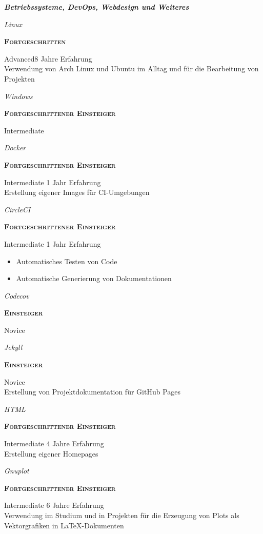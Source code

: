 \documentclass[8pt]{article}
\newcommand{\cvSubsectionStyle}{%
  \normalfont%
  \sffamily%
  \itshape%
  \bfseries%
  \color{cvSubsectionColor}%
}
\newcommand{\cvSubsection}[1]{%
  \begin{tcolorbox}[left=0pt, top=0pt, bottom=0pt, right=0pt, boxsep=5pt, arc=5pt, frame code={}, colback=cvBackgroundColor]
    \cvSubsectionStyle #1%
  \end{tcolorbox}
}
\newenvironment{cvItemize}{%
  \begin{itemize}[itemsep=0mm, leftmargin=4mm]
}{%
  \end{itemize}
}
\newenvironment{cvSkillItem}[2]{
  \par
  \begin{minipage}[c]{0.2\linewidth}
    \raggedleft
    \normalfont
    \sffamily
    \itshape
    #1
  \end{minipage}
  \hspace{0.02\linewidth}
  \vrule
  \hspace{0.02\linewidth}
  \begin{minipage}[t]{0.74\linewidth}
    \sffamily\textsc{\color{cvColor} \textbf{#2}}\par
    \normalfont\footnotesize\sffamily\color{cvContentColor}
}{
  \end{minipage}
  \par%
  \vspace{\baselineskip}%
}
\begin{document}
    \cvSubsection{Betriebssysteme, DevOps, Webdesign und Weiteres}
      \vspace{-1.8em}
      \begin{multicols}{2}
        \begin{cvSkillItem}{Linux}{Fortgeschritten}
          Advanced\hfill 8 Jahre Erfahrung \\[1pt]
          Verwendung von Arch Linux und Ubuntu im Alltag und für die Bearbeitung von Projekten
        \end{cvSkillItem}
        \begin{cvSkillItem}{Windows}{Fortgeschrittener Einsteiger}
          Intermediate
        \end{cvSkillItem}
        \begin{cvSkillItem}{Docker}{Fortgeschrittener Einsteiger}
          Intermediate \hfill 1 Jahr Erfahrung \\[1pt]
          Erstellung eigener Images für CI-Umgebungen
        \end{cvSkillItem}
        \begin{cvSkillItem}{CircleCI}{Fortgeschrittener Einsteiger}
          Intermediate \hfill 1 Jahr Erfahrung
          \begin{cvItemize}
            \item Automatisches Testen von Code
            \item Automatische Generierung von Dokumentationen
          \end{cvItemize}
        \end{cvSkillItem}
        \begin{cvSkillItem}{Codecov}{Einsteiger}
          Novice
        \end{cvSkillItem}
        \begin{cvSkillItem}{Jekyll}{Einsteiger}
          Novice \\[1pt]
          Erstellung von Projektdokumentation für GitHub Pages
        \end{cvSkillItem}
        \begin{cvSkillItem}{HTML}{Fortgeschrittener Einsteiger}
          Intermediate \hfill 4 Jahre Erfahrung \\[1pt]
          Erstellung eigener Homepages
        \end{cvSkillItem}
        \begin{cvSkillItem}{Gnuplot}{Fortgeschrittener Einsteiger}
          Intermediate \hfill 6 Jahre Erfahrung \\[1pt]
          Verwendung im Studium und in Projekten für die Erzeugung von Plots als Vektorgrafiken in LaTeX-Dokumenten
        \end{cvSkillItem}
      \end{multicols}
\end{document}
